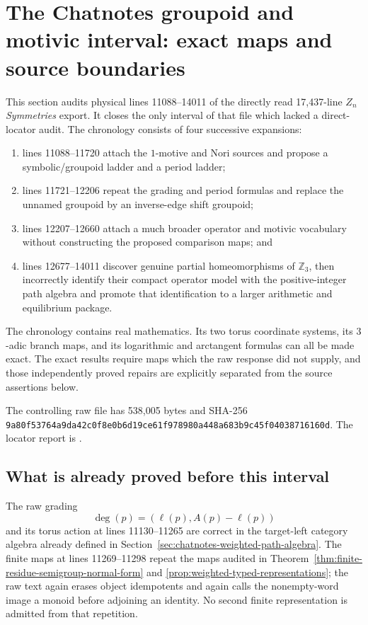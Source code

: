 \section{The Chatnotes groupoid and motivic interval: exact maps and source boundaries}
\label{sec:chatnotes-groupoid-motivic}

This section audits physical lines 11088--14011 of the directly read
17,437-line \emph{$Z_n$ Symmetries} export.  It closes the only interval of
that file which lacked a direct-locator audit.  The chronology consists of
four successive expansions:
\begin{enumerate}[label=\textup{(\roman*)}]
\item lines 11088--11720 attach the $1$-motive and Nori sources and propose a
  symbolic/groupoid ladder and a period ladder;
\item lines 11721--12206 repeat the grading and period formulas and replace
  the unnamed groupoid by an inverse-edge shift groupoid;
\item lines 12207--12660 attach a much broader operator and motivic
  vocabulary without constructing the proposed comparison maps; and
\item lines 12677--14011 discover genuine partial homeomorphisms of
  $\mathbb Z_3$, then incorrectly identify their compact operator model with
  the positive-integer path algebra and promote that identification to a
  larger arithmetic and equilibrium package.
\end{enumerate}
The chronology contains real mathematics.  Its two torus coordinate systems,
its $3$-adic branch maps, and its logarithmic and arctangent formulas can all
be made exact.  The exact results require maps which the raw response did not
supply, and those independently proved repairs are explicitly separated from
the source assertions below.

The controlling raw file has 538,005 bytes and SHA-256
\nolinkurl{9a80f53764a9da42c0f8e0b6d19ce61f978980a448a683b9c45f04038716160d}.
The locator report is
.

\subsection{What is already proved before this interval}

The raw grading
\[
 \deg(p)=(\ell(p),A(p)-\ell(p))
\]
and its torus action at lines 11130--11265 are correct in the target-left
category algebra already defined in
Section~\ref{sec:chatnotes-weighted-path-algebra}.  The finite maps at lines
11269--11298 repeat the maps audited in
Theorem~\ref{thm:finite-residue-semigroup-normal-form} and
\ref{prop:weighted-typed-representations}; the raw text again erases object
idempotents and again calls the nonempty-word image a monoid before adjoining
an identity.  No second finite representation is admitted from that
repetition.

